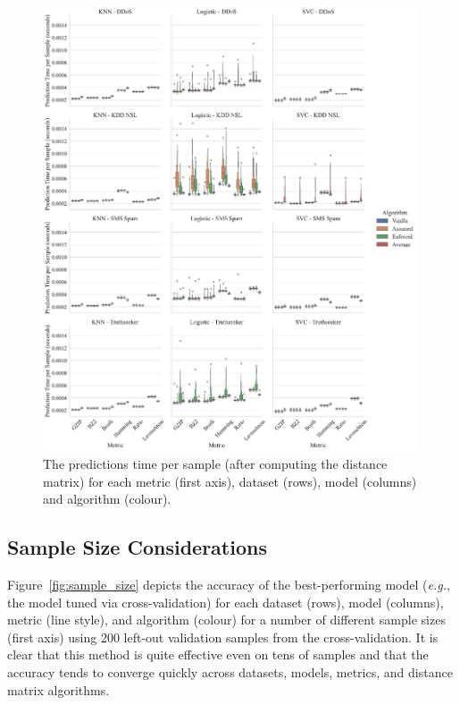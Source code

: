 \documentclass[preprint,12pt]{article}
\begin{document}
\begin{figure}[H]
    \centering
    \includegraphics[width=0.99\textwidth]{images/pred_time_vs_algorithm.pdf}
    \caption{The predictions time per sample (after computing the distance matrix) for each metric (first axis), dataset (rows), model (columns) and algorithm (colour).}
    \label{fig:pred_time}
\end{figure}



\subsection{Sample Size Considerations}

Figure~\ref{fig:sample_size} depicts the accuracy of the best-performing model (\textit{e.g.}, the model tuned via cross-validation) for each dataset (rows), model (columns), metric (line style), and algorithm (colour) for a number of different sample sizes (first axis) using 200 left-out validation samples from the cross-validation.
It is clear that this method is quite effective even on tens of samples and that the accuracy tends to converge quickly across datasets, models, metrics, and distance matrix algorithms.
\end{document}

